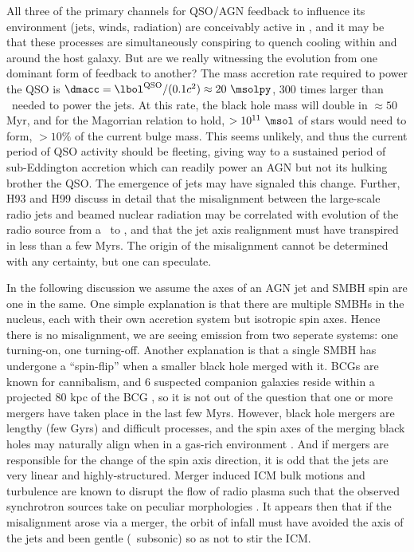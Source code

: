 \documentclass[useAMS,usenatbib]{mn2e}
\begin{document}
All three of the primary channels for QSO/AGN feedback to influence
its environment (jets, winds, radiation) are conceivably active in
\irs, and it may be that these processes are simultaneously conspiring
to quench cooling within and around the host galaxy. But are we really
witnessing the evolution from one dominant form of feedback to
another? The mass accretion rate required to power the QSO is $\dmacc
= \lqso/(0.1 c^2) \approx 20 ~\msolpy$, 300 times larger than
\dmacc\ needed to power the jets. At this rate, the black hole mass
will double in $\approx 50$ Myr, and for the Magorrian relation to
hold, $> 10^{11} ~\msol$ of stars would need to form, $> 10\%$ of the
current bulge mass. This seems unlikely, and thus the current period
of QSO activity should be fleeting, giving way to a sustained period
of sub-Eddington accretion which can readily power an AGN but not its
hulking brother the QSO. The emergence of jets may have signaled this
change. Further, H93 and H99 discuss in detail that the misalignment
between the large-scale radio jets and beamed nuclear radiation may be
correlated with evolution of the radio source from a \frii\ to \fri,
and that the jet axis realignment must have transpired in less than a
few Myrs. The origin of the misalignment cannot be determined with any
certainty, but one can speculate.

In the following discussion we assume the axes of an AGN jet and SMBH
spin are one in the same. One simple explanation is that there are
multiple SMBHs in the nucleus, each with their own accretion system
but isotropic spin axes. Hence there is no misalignment, we are seeing
emission from two seperate systems: one turning-on, one
turning-off. Another explanation is that a single SMBH has undergone a
``spin-flip'' \citep{2002Sci...297.1310M} when a smaller black hole
merged with it. BCGs are known for cannibalism, and 6 suspected
companion galaxies reside within a projected 80 kpc of the BCG
\citep{1996AJ....111..649S, 1999Ap&SS.266..113A}, so it is not out of
the question that one or more mergers have taken place in the last few
Myrs. However, black hole mergers are lengthy (few Gyrs) and difficult
processes, and the spin axes of the merging black holes may naturally
align when in a gas-rich environment \citep{2007ApJ...661L.147B}. And
if mergers are responsible for the change of the spin axis direction,
it is odd that the jets are very linear and highly-structured. Merger
induced ICM bulk motions and turbulence are known to disrupt the flow
of radio plasma such that the observed synchrotron sources take on
peculiar morphologies \citep[\eg][]{2009A&A...495..721S,
  2010arXiv1002.0395S}. It appears then that if the misalignment arose
via a merger, the orbit of infall must have avoided the axis of the
jets and been gentle (\ie\ subsonic) so as not to stir the ICM.
\end{document}
